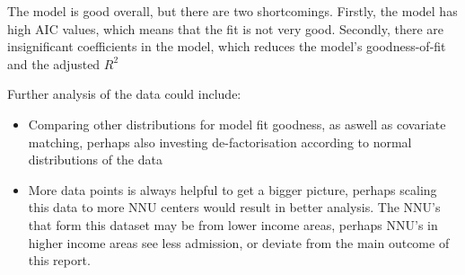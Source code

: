 \documentclass[11pt]{article}
\begin{document}
The model is good overall, but there are two shortcomings. Firstly, the model has high AIC values, which means that the fit is not very good. Secondly, there are insignificant coefficients in the model, which reduces the model's goodness-of-fit and the adjusted $R^2$

Further analysis of the data could include:
\begin{itemize}
    \item Comparing other distributions for model fit goodness, as aswell as covariate matching, perhaps also investing de-factorisation according to normal distributions of the data
    \item More data points is always helpful to get a bigger picture, perhaps scaling this data to more NNU centers would result in better analysis. The NNU's that form this dataset may be from lower income areas, perhaps NNU's in higher income areas see less admission, or deviate from the main outcome of this report.
\end{itemize}
\renewcommand\bibname{References}
\printbibliography
\end{document}
